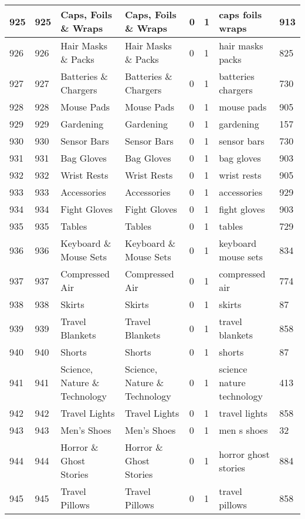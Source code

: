 \begin{longtable}{|l|l|l|l|l|l|l|l|}
925 & 925 & Caps, Foils \& Wraps & Caps, Foils \& Wraps & 0 & 1 & caps foils wraps & 913 \\ \hline 
926 & 926 & Hair Masks \& Packs & Hair Masks \& Packs & 0 & 1 & hair masks packs & 825 \\ \hline 
927 & 927 & Batteries \& Chargers & Batteries \& Chargers & 0 & 1 & batteries chargers & 730 \\ \hline 
928 & 928 & Mouse Pads & Mouse Pads & 0 & 1 & mouse pads & 905 \\ \hline 
929 & 929 & Gardening & Gardening & 0 & 1 & gardening & 157 \\ \hline 
930 & 930 & Sensor Bars & Sensor Bars & 0 & 1 & sensor bars & 730 \\ \hline 
931 & 931 & Bag Gloves & Bag Gloves & 0 & 1 & bag gloves & 903 \\ \hline 
932 & 932 & Wrist Rests & Wrist Rests & 0 & 1 & wrist rests & 905 \\ \hline 
933 & 933 & Accessories & Accessories & 0 & 1 & accessories & 929 \\ \hline 
934 & 934 & Fight Gloves & Fight Gloves & 0 & 1 & fight gloves & 903 \\ \hline 
935 & 935 & Tables & Tables & 0 & 1 & tables & 729 \\ \hline 
936 & 936 & Keyboard \& Mouse Sets & Keyboard \& Mouse Sets & 0 & 1 & keyboard mouse sets & 834 \\ \hline 
937 & 937 & Compressed Air & Compressed Air & 0 & 1 & compressed air & 774 \\ \hline 
938 & 938 & Skirts & Skirts & 0 & 1 & skirts & 87 \\ \hline 
939 & 939 & Travel Blankets & Travel Blankets & 0 & 1 & travel blankets & 858 \\ \hline 
940 & 940 & Shorts & Shorts & 0 & 1 & shorts & 87 \\ \hline 
941 & 941 & Science, Nature \& Technology & Science, Nature \& Technology & 0 & 1 & science nature technology & 413 \\ \hline 
942 & 942 & Travel Lights & Travel Lights & 0 & 1 & travel lights & 858 \\ \hline 
943 & 943 & Men's Shoes & Men's Shoes & 0 & 1 & men s shoes & 32 \\ \hline 
944 & 944 & Horror \& Ghost Stories & Horror \& Ghost Stories & 0 & 1 & horror ghost stories & 884 \\ \hline 
945 & 945 & Travel Pillows & Travel Pillows & 0 & 1 & travel pillows & 858 \\ \hline 

\end{longtable}
